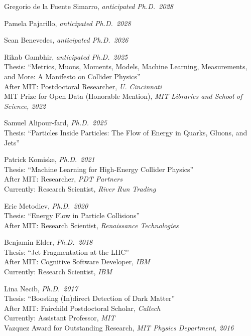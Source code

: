\bbl

\item Gregorio de la Fuente Simarro, \emph{anticipated Ph.D.~2028}

\item Pamela Pajarillo, \emph{anticipated Ph.D.~2028}

\item Sean Benevedes, \emph{anticipated Ph.D.~2026}

\item Rikab Gambhir, \emph{anticipated Ph.D.~2025}
\\ Thesis: ``Metrics, Muons, Moments, Models, Machine Learning, Measurements, and More: A Manifesto on Collider Physics''
\\ After MIT: Postdoctoral Researcher, \emph{U. Cincinnati}
\\ MIT Prize for Open Data (Honorable Mention), \emph{MIT Libraries and School of Science, 2022}

\item Samuel Alipour-fard, \emph{Ph.D.~2025}
\\ Thesis: ``Particles Inside Particles: The Flow of Energy in Quarks, Gluons, and Jets''

\item Patrick Komiske, \emph{Ph.D.~2021}
\\ Thesis: ``Machine Learning for High-Energy Collider Physics''
\\ After MIT: Researcher, \emph{PDT Partners}
\\ Currently: Research Scientist, \emph{River Run Trading}

\item Eric Metodiev, \emph{Ph.D.~2020}
\\ Thesis: ``Energy Flow in Particle Collisions''
\\ After MIT: Research Scientist, \emph{Renaissance Technologies}

\item Benjamin Elder, \emph{Ph.D.~2018}
\\ Thesis: ``Jet Fragmentation at the LHC''
\\ After MIT: Cognitive Software Developer, \emph{IBM}
\\ Currently: Research Scientist, \emph{IBM}

\item Lina Necib, \emph{Ph.D.~2017}
\\ Thesis: ``Boosting (In)direct Detection of Dark Matter''
\\ After MIT: Fairchild Postdoctoral Scholar, \emph{Caltech}
\\ Currently: Assistant Professor, \emph{MIT}
\\ Vazquez Award for Outstanding Research, \emph{MIT Physics Department, 2016}

